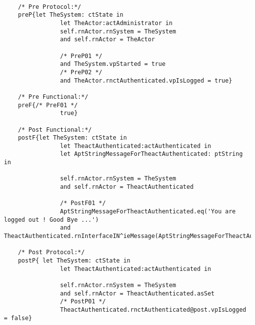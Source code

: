 	\scriptsize
	\vspace{0.5cm}
	\begin{lstlisting}[style=MessirStyle,firstnumber=auto,captionpos=b,caption={\msrmessir (MCL-oriented) specification of the operation \emph{oeLogout}.},label=OM-actAuthenticated-oeLogout-MCL-LST]

	/* Pre Protocol:*/ 
	preP{let TheSystem: ctState in
				let TheActor:actAdministrator in
				self.rnActor.rnSystem = TheSystem
				and self.rnActor = TheActor
		
				/* PreP01 */
				and TheSystem.vpStarted = true
		 		/* PreP02 */
				and TheActor.rnctAuthenticated.vpIsLogged = true}
	
	/* Pre Functional:*/
	preF{/* PreF01 */
				true}
	
	/* Post Functional:*/ 
	postF{let TheSystem: ctState in
				let TheactAuthenticated:actAuthenticated in
				let AptStringMessageForTheactAuthenticated: ptString in
		
				self.rnActor.rnSystem = TheSystem
				and self.rnActor = TheactAuthenticated
		
				/* PostF01 */
				AptStringMessageForTheactAuthenticated.eq('You are logged out ! Good Bye ...')
				and TheactAuthenticated.rnInterfaceIN^ieMessage(AptStringMessageForTheactAuthenticated)}
	
	/* Post Protocol:*/ 
	postP{ let TheSystem: ctState in
				let TheactAuthenticated:actAuthenticated in
		
				self.rnActor.rnSystem = TheSystem
				and self.rnActor = TheactAuthenticated.asSet
				/* PostP01 */
				TheactAuthenticated.rnctAuthenticated@post.vpIsLogged = false}
	
	\end{lstlisting}
	\normalsize 
	
	
	
	





